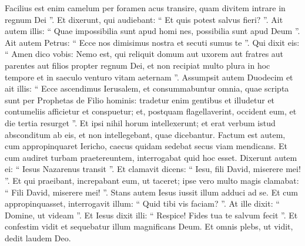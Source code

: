\begin{biblechapter}
\begin{biblechapter}
\begin{biblechapter}
\begin{biblechapter}
\begin{biblechapter}
\begin{biblechapter}
\begin{biblechapter}
\begin{biblechapter}
\begin{biblechapter}
\begin{biblechapter}
\begin{biblechapter}
\begin{biblechapter}
\begin{biblechapter}
\begin{biblechapter}
\begin{biblechapter}
\begin{biblechapter}
\begin{biblechapter}
\begin{biblechapter}
 \verse Facilius est enim camelum per foramen acus transire, quam divitem intrare in regnum Dei ”. 
\verse Et dixerunt, qui audiebant: “ Et quis potest salvus fieri? ”. 
\verse Ait autem illis: “ Quae impossibilia sunt apud homi nes, possibilia sunt apud Deum ”. 
\verse Ait autem Petrus: “ Ecce nos dimisimus nostra et secuti sumus te ”. 
\verse Qui dixit eis: “ Amen dico vobis: Nemo est, qui reliquit domum aut uxorem aut fratres aut parentes aut filios propter regnum Dei, 
\verse et non recipiat multo plura in hoc tempore et in saeculo venturo vitam aeternam ”.
 \verse Assumpsit autem Duodecim et ait illis: “ Ecce ascendimus Ierusalem, et consummabuntur omnia, quae scripta sunt per Prophetas de Filio hominis: 
\verse tradetur enim gentibus et illudetur et contumeliis afficietur et conspuetur; 
 \verse et, postquam flagellaverint, occident eum, et die tertia resurget ”. 
\verse Et ipsi nihil horum intellexerunt; et erat verbum istud absconditum ab eis, et non intellegebant, quae dicebantur.
 \verse Factum est autem, cum appropinquaret Iericho, caecus quidam sedebat secus viam mendicans. 
\verse Et cum audiret turbam praetereuntem, interrogabat quid hoc esset. 
\verse Dixerunt autem ei: “ Iesus Nazarenus transit ”. 
\verse Et clamavit dicens: “ Iesu, fili David, miserere mei! ”. 
\verse Et qui praeibant, increpabant eum, ut taceret; ipse vero multo magis clamabat: “ Fili David, miserere mei! ”. 
\verse Stans autem Iesus iussit illum adduci ad se. Et cum appropinquasset, interrogavit illum: 
\verse “ Quid tibi vis faciam? ”. At ille dixit: “ Domine, ut videam ”. 
\verse Et Iesus dixit illi: “ Respice! Fides tua te salvum fecit ”. \verse Et confestim vidit et sequebatur illum magnificans Deum. Et omnis plebs, ut vidit, dedit laudem Deo.
 

\end{biblechapter}
\end{biblechapter}
\end{biblechapter}
\end{biblechapter}
\end{biblechapter}
\end{biblechapter}
\end{biblechapter}
\end{biblechapter}
\end{biblechapter}
\end{biblechapter}
\end{biblechapter}
\end{biblechapter}
\end{biblechapter}
\end{biblechapter}
\end{biblechapter}
\end{biblechapter}
\end{biblechapter}
\end{biblechapter}
